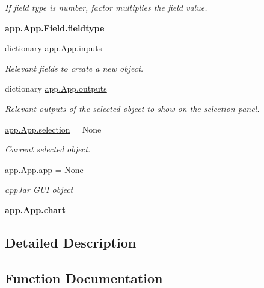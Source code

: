 \begin{DoxyCompactItemize}
\begin{DoxyCompactList}\small\item\em If field type is number, factor multiplies the field value. \end{DoxyCompactList}\item 
\mbox{\label{group___g_u_i_ga2b84546c227ee521e1a4776cd07aabe8}} 
{\bfseries app.\+App.\+Field.\+fieldtype}
\item 
dictionary \hyperlink{group___g_u_i_ga3bf8c9ac0786fd812dfca551db862795}{app.\+App.\+inputs}
\begin{DoxyCompactList}\small\item\em Relevant fields to create a new object. \end{DoxyCompactList}\item 
dictionary \hyperlink{group___g_u_i_gae2e6dcf1628c915d04b82f391253655f}{app.\+App.\+outputs}
\begin{DoxyCompactList}\small\item\em Relevant outputs of the selected object to show on the selection panel. \end{DoxyCompactList}\item 
\hyperlink{group___g_u_i_ga4cdfedd89ae2ab7854c7062dcb388acd}{app.\+App.\+selection} = None
\begin{DoxyCompactList}\small\item\em Current selected object. \end{DoxyCompactList}\item 
\mbox{\label{group___g_u_i_ga7e1b425e21cce7dcb596d72fad3c3282}} 
\hyperlink{group___g_u_i_ga7e1b425e21cce7dcb596d72fad3c3282}{app.\+App.\+app} = None
\begin{DoxyCompactList}\small\item\em app\+Jar G\+UI object \end{DoxyCompactList}\item 
\mbox{\label{group___g_u_i_ga9de028570fbb7ebc55c4e60f90bd1a38}} 
{\bfseries app.\+App.\+chart}
\end{DoxyCompactItemize}


\subsection{Detailed Description}


\subsection{Function Documentation}
\mbox{\label{group___g_u_i_ga7ebfdd74ff42ca9b5c1dd6383b4641f8}} 
